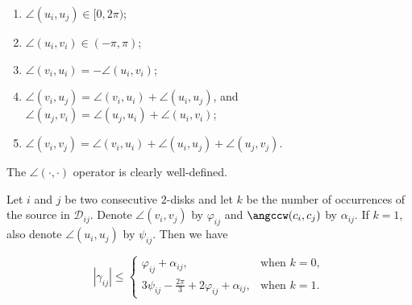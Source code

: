 \begin{enumerate}[label={\{\arabic*\}}]
\item $\angle(u_i, u_j)\in[0, 2\pi)$; \label{rule:uu}
\item $\angle(u_i, v_i)\in(-\pi, \pi)$; \label{rule:uivi} %
\item $\angle(v_i, u_i) = -\angle(u_i, v_i)$; \label{rule:viui}
\item $\angle(v_i, u_j) = \angle(v_i, u_i) + \angle(u_i, u_j)$, and $\angle(u_j, v_i) = \angle(u_j, u_i) + \angle(u_i, v_i)$; \label{rule:uivj}
\item $\angle(v_i, v_j) = \angle(v_i, u_i) + \angle(u_i, u_j) + \angle(u_j, v_j)$. \label{rule:vv}
\end{enumerate}

The $\angle(\cdot, \cdot)$ operator is clearly well-defined.



\begin{claim}
\label{lemma:can-construct}

Let $i$ and $j$ be two consecutive $2$-disks and let $k$ be the number of occurrences of the source in $\mathcal{D}_{ij}$. Denote $\angle(v_i, v_j)$ by $\varphi_{ij}$ and $\angccw(c_i, c_j)$ by $\alpha_{ij}$. If $k = 1$, also denote $\angle(u_i, u_j)$ by $\psi_{ij}$. Then we have

\begin{equation*}
\label{eq:curve_bound}
|\gamma_{ij}|\leq\begin{cases}
\displaystyle
\varphi_{ij} + \alpha_{ij}, & \text{when }k = 0, \\
3\psi_{ij} - \frac{2\pi}{3} + 2\varphi_{ij} + \alpha_{ij}, & \text{when }k = 1.
\end{cases}%
\end{equation*}
\end{claim}

